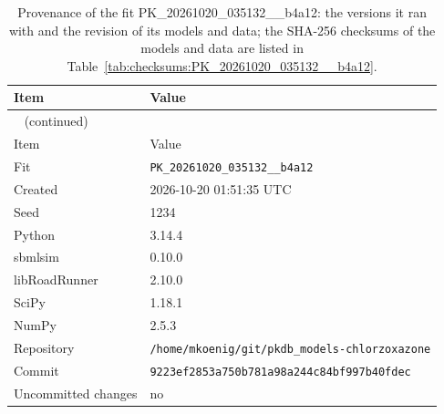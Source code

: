 \documentclass{article}
\begin{document}
\begin{longtable}{ll}
\caption{Provenance of the fit PK\_20261020\_035132\_\_b4a12: the versions it ran with and the revision of its models and data; the SHA-256 checksums of the models and data are listed in Table~\ref{tab:checksums:PK_20261020_035132__b4a12}.}\label{tab:provenance:PK_20261020_035132__b4a12} \\
\toprule
Item & Value \\
\midrule
\endfirsthead
\multicolumn{2}{l}{\small\tablename~\thetable{} (continued)} \\
\toprule
Item & Value \\
\midrule
\endhead
\bottomrule
\endlastfoot
Fit & \texttt{PK\_20261020\_035132\_\_b4a12} \\
Created & 2026-10-20 01:51:35 UTC \\
Seed & 1234 \\
Python & 3.14.4 \\
sbmlsim & 0.10.0 \\
libRoadRunner & 2.10.0 \\
SciPy & 1.18.1 \\
NumPy & 2.5.3 \\
Repository & \texttt{/home/mkoenig/git/pkdb\_models-chlorzoxazone} \\
Commit & \texttt{9223ef2853a750b781a98a244c84bf997b40fdec} \\
Uncommitted changes & no \\
\end{longtable}



\end{document}
